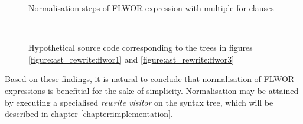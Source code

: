 \begin{figure}[!h]
{{			\label{figure:ast_rewrite:flwor2}
		}
		\quad
	}
	\caption{Normalisation steps of FLWOR expression with multiple for-clauses}
\end{figure}

\begin{figure}[!h]
	\centering
	\mbox{
		\quad
	}
	\caption{Hypothetical source code corresponding to the trees in figures
		\ref{figure:ast_rewrite:flwor1} and \ref{figure:ast_rewrite:flwor3}}
	\label{figure:ast_rewrite:flwor_src}
\end{figure}

Based on these findings, it is natural to conclude that normalisation of FLWOR
expressions is benefitial for the sake of simplicity. Normalisation may be
attained by executing a specialised \textit{rewrite visitor} on the syntax
tree, which will be described in chapter \ref{chapter:implementation}.